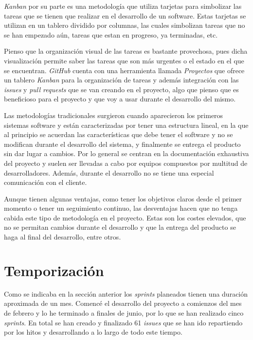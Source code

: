 \textit{Kanban} por su parte es una metodología que utiliza tarjetas para simbolizar las tareas que se tienen que realizar en el desarrollo de un software. Estas tarjetas se utilizan en un tablero dividido por columnas, las cuales simbolizan tareas que no se han empezado aún, tareas que estan en progreso, ya terminadas, etc.

Pienso que la organización visual de las tareas es bastante provechosa, pues dicha visualización permite saber las tareas que son más urgentes o el estado en el que se encuentran. \textit{GitHub} cuenta con una herramienta llamada \textit{Proyectos} que ofrece un tablero \textit{Kanban} para la organización de tareas y además integración con las \textit{issues} y \textit{pull requests} que se van creando en el proyecto, algo que pienso que es beneficioso para el proyecto y que voy a usar durante el desarrollo del mismo.

Las metodologías tradicionales surgieron cuando aparecieron los primeros sistemas software y están caracterizadas por tener una estructura lineal, en la que al principio se acuerdan las características que debe tener el software y no se modifican durante el desarrollo del sistema, y finalmente se entrega el producto sin dar lugar a cambios. Por lo general se centran en la documentación exhaustiva del proyecto y suelen ser llevadas a cabo por equipos compuestos por multitud de desarrolladores. Además, durante el desarrollo no se tiene una especial comunicación con el cliente.

Aunque tienen algunas ventajas, como tener los objetivos claros desde el primer momento o tener un seguimiento continuo, las desventajas hacen que no tenga cabida este tipo de metodología en el proyecto. Estas son los costes elevados, que no se permitan cambios durante el desarrollo y que la entrega del producto se haga al final del desarrollo, entre otros.


\section{Temporización}

Como se indicaba en la sección anterior los \textit{sprints} planeados tienen una duración aproximada de un mes. Comencé el desarrollo del proyecto a comienzos del mes de febrero y lo he terminado a finales de junio, por lo que se han realizado cinco \textit{sprints}. En total se han creado y finalizado 61 \textit{issues} que se han ido repartiendo por los hitos y desarrollando a lo largo de todo este tiempo. 

